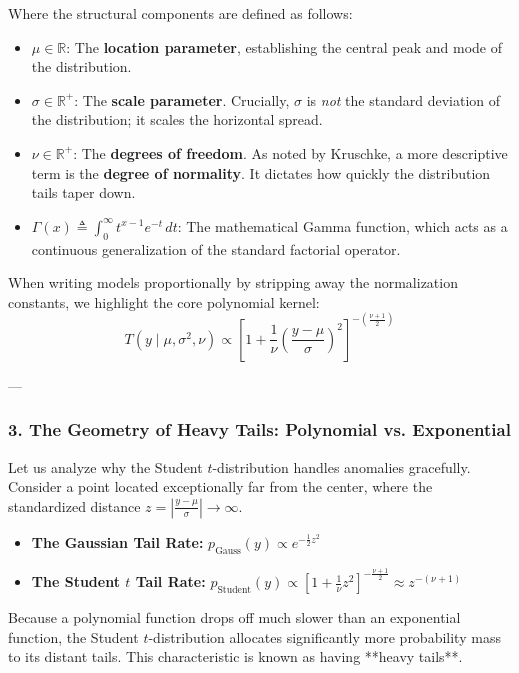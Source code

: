 \documentclass{article}
\begin{document}
Where the structural components are defined as follows:
\begin{itemize}
    \item $\mu \in \mathbb{R}$: The \textbf{location parameter}, establishing the central peak and mode of the distribution.
    \item $\sigma \in \mathbb{R}^+$: The \textbf{scale parameter}. Crucially, $\sigma$ is \textit{not} the standard deviation of the distribution; it scales the horizontal spread.
    \item $\nu \in \mathbb{R}^+$: The \textbf{degrees of freedom}. As noted by Kruschke, a more descriptive term is the \textbf{degree of normality}. It dictates how quickly the distribution tails taper down.
    \item $\Gamma(x) \triangleq \int_{0}^{\infty} t^{x-1} e^{-t} \, dt$: The mathematical Gamma function, which acts as a continuous generalization of the standard factorial operator.
\end{itemize}

When writing models proportionally by stripping away the normalization constants, we highlight the core polynomial kernel:
\begin{equation}
    T(y \mid \mu, \sigma^2, \nu) \propto \left[ 1 + \frac{1}{\nu}\left(\frac{y - \mu}{\sigma}\right)^2 \right]^{-\left(\frac{\nu+1}{2}\right)}
\end{equation}

---

\subsubsection*{3. The Geometry of Heavy Tails: Polynomial vs. Exponential}
Let us analyze why the Student $t$-distribution handles anomalies gracefully. Consider a point located exceptionally far from the center, where the standardized distance $z = \left|\frac{y - \mu}{\sigma}\right| \to \infty$.

\begin{itemize}
    \item \textbf{The Gaussian Tail Rate:} $p_{\text{Gauss}}(y) \propto e^{-\frac{1}{2}z^2}$
    \item \textbf{The Student $t$ Tail Rate:} $p_{\text{Student}}(y) \propto \left[1 + \frac{1}{\nu}z^2\right]^{-\frac{\nu+1}{2}} \approx z^{-(\nu+1)}$
\end{itemize}

Because a polynomial function drops off much slower than an exponential function, the Student $t$-distribution allocates significantly more probability mass to its distant tails. This characteristic is known as having **heavy tails**. 
\end{document}
